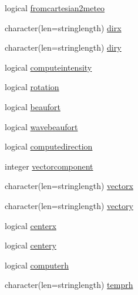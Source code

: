 \begin{DoxyCompactItemize}
logical \mbox{\hyperlink{structmodulenetcdfcf__2__hdf5mohid_1_1t__field_a06534522dd9e42d2ffc0cc39b08f7d95}{fromcartesian2meteo}}
\item 
character(len=stringlength) \mbox{\hyperlink{structmodulenetcdfcf__2__hdf5mohid_1_1t__field_ad044f83d64eb1ecd83337e8abfbba20c}{dirx}}
\item 
character(len=stringlength) \mbox{\hyperlink{structmodulenetcdfcf__2__hdf5mohid_1_1t__field_aefb89e4b51d5eec0b400c9833627eccd}{diry}}
\item 
logical \mbox{\hyperlink{structmodulenetcdfcf__2__hdf5mohid_1_1t__field_acd39f5cbac8168c496d234744f891f55}{computeintensity}}
\item 
logical \mbox{\hyperlink{structmodulenetcdfcf__2__hdf5mohid_1_1t__field_a8f83e4314d48e3b7fb63ac4e7311b06f}{rotation}}
\item 
logical \mbox{\hyperlink{structmodulenetcdfcf__2__hdf5mohid_1_1t__field_adada99bf505ec218ad0160e1e6549bfa}{beaufort}}
\item 
logical \mbox{\hyperlink{structmodulenetcdfcf__2__hdf5mohid_1_1t__field_a9dcf8940fc8f6aeb1add0506a601f13e}{wavebeaufort}}
\item 
logical \mbox{\hyperlink{structmodulenetcdfcf__2__hdf5mohid_1_1t__field_ac346752f773fae121ee82a7e8b721e5c}{computedirection}}
\item 
integer \mbox{\hyperlink{structmodulenetcdfcf__2__hdf5mohid_1_1t__field_a3312fbbd3f4ab7f607e86b484370041c}{vectorcomponent}}
\item 
character(len=stringlength) \mbox{\hyperlink{structmodulenetcdfcf__2__hdf5mohid_1_1t__field_ab64fc966c82eb79bcca4f3e501629e73}{vectorx}}
\item 
character(len=stringlength) \mbox{\hyperlink{structmodulenetcdfcf__2__hdf5mohid_1_1t__field_ac517f44decce2da882c6c12d6c9a29f9}{vectory}}
\item 
logical \mbox{\hyperlink{structmodulenetcdfcf__2__hdf5mohid_1_1t__field_a38e2163c2a088a7012627f9218ed638d}{centerx}}
\item 
logical \mbox{\hyperlink{structmodulenetcdfcf__2__hdf5mohid_1_1t__field_a286353601c20ee8cdbe04348094d9b56}{centery}}
\item 
logical \mbox{\hyperlink{structmodulenetcdfcf__2__hdf5mohid_1_1t__field_a8eae55e354a4fb2db4543826518d2879}{computerh}}
\item 
character(len=stringlength) \mbox{\hyperlink{structmodulenetcdfcf__2__hdf5mohid_1_1t__field_a06505e4f931c3ad4a45f2459517cadb8}{temprh}}
\item 

\end{DoxyCompactItemize}
